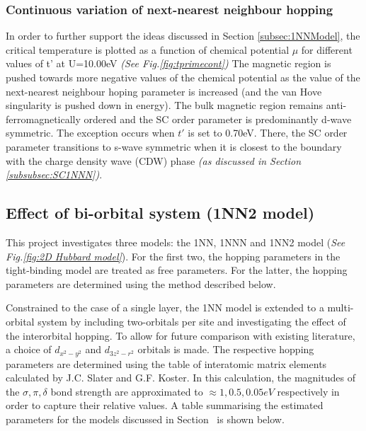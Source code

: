 \documentclass[12pt]{article}
\begin{document}
\subsubsection{Continuous variation of next-nearest neighbour hopping}

In order to further support the ideas discussed in Section \ref{subsec:1NNModel}, the critical temperature
is plotted as a function of chemical potential $\mu$ for different values of t' at U=10.00eV \textit{(See Fig.\ref{fig:tprimecont})}
The magnetic region is pushed towards more negative values of the chemical potential as the value of the next-nearest 
neighbour hoping parameter is increased (and the van Hove singularity is pushed down in energy). The bulk magnetic
region remains anti-ferromagnetically ordered and the SC order parameter is predominantly d-wave symmetric. The exception occurs when
$t'$ is set to 0.70eV. There, the SC order parameter transitions to s-wave symmetric when it is closest to the boundary 
with the charge density wave (CDW) phase \textit{(as discussed in Section \ref{subsubsec:SC1NNN})}.

\subsection{Effect of bi-orbital system (1NN2 model)}
\label{subsec:1NN2Model}


This project investigates three models: the 1NN, 1NNN and 1NN2 model (\textit{See Fig.\ref{fig:2D Hubbard model}}). For the first two, the hopping parameters in the tight-binding model are treated as free parameters. 
For the latter, the hopping parameters are determined using the method described below. \par
\medskip
\noindent Constrained to the case of a single layer, the 1NN model is extended to a multi-orbital system by
including two-orbitals per site and investigating the effect of the interorbital hopping. To allow for future comparison with
existing literature\cite{sakakibara2024possible}, a choice of $d_{x^2-y^2}$ and $d_{3z^2 -r^2}$ orbitals is made. 
The respective hopping parameters are determined using the  table of interatomic matrix elements calculated by J.C. Slater and G.F. Koster\cite{slater1954simplified}. 
In this calculation, the magnitudes of the $\sigma,  \pi, \delta$ bond strength  are approximated to  $\approx  1, 0.5, 0.05eV$ respectively in order to capture their relative values\cite{blanksby2003bond, mcgrady2015introduction, krapp2008strength}.
A table summarising the estimated parameters for the models  discussed in Section~ is shown below.
\end{document}

